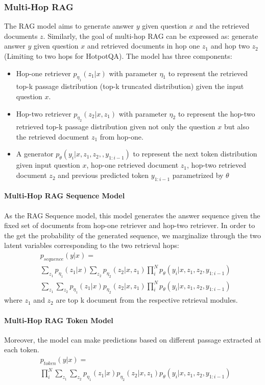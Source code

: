 \subsubsection{Multi-Hop RAG}

The RAG model aims to generate answer $y$ given question $x$ and the retrieved documents $z$. Similarly, the goal of multi-hop RAG can be expressed as: generate answer $y$ given question $x$ and retrieved documents in hop one $z_1$ and hop two $z_2$ (Limiting to two hops for HotpotQA). The model has three components: 
\begin{itemize}
    \item Hop-one retriever $p_{\eta_1}(z_1|x)$ with parameter $\eta_1$ to represent the retrieved top-k passage distribution (top-k truncated distribution) given the input question $x$. 
    \item Hop-two retriever $p_{\eta_2}(z_2|x, z_1)$ with parameter $\eta_2$ to represent the hop-two retrieved top-k passage distribution given not only the question $x$ but also the retrieved document $z_1$ from hop-one. 
    \item A generator $p_\theta(y_i|x, z_1, z_2, , y_{1:i-1})$ to represent the next token distribution given input question $x$, hop-one retrieved document $z_1$, hop-two retrieved document $z_2$ and previous predicted token $y_{1:i-1}$ parametrized by $\theta$
\end{itemize}
 \paragraph{Multi-Hop RAG Sequence Model}
 As the RAG Sequence model, this model generates the answer sequence given the fixed set of documents from hop-one retriever and hop-two retriever. In order to the get the probability of the generated sequence, we marginalize through the two latent variables corresponding to the two retrieval hops:
\begin{align*}
& p_{\textit{sequence}}(y|x) = \\
& \sum_{z_1}  p_{\eta_1}(z_1|x)\sum_{z_2} p_{\eta_2}(z_2|x, z_1) \prod_{i}^{N} p_\theta(y_i|x, z_1, z_2, y_{1:i-1}) \\
& \sum_{z_1} \sum_{z_2}  p_{\eta_1}(z_1|x) p_{\eta_2}(z_2|x, z_1) \prod_{i}^{N} p_\theta(y_i|x, z_1, z_2, y_{1:i-1})
\end{align*}
where $z_1$ and $z_2$ are top k document from the respective retrieval modules.

 \paragraph{Multi-Hop RAG Token Model}
 Moreover, the model can make predictions based on different passage extracted at each token. 
\begin{align*}
& p_{\textit{token}}(y|x) = \\
& \prod_{i}^{N}  \sum_{z_1}  \sum_{z_2} p_{\eta_1}(z_1|x) p_{\eta_2}(z_2|x, z_1) p_\theta(y_i|x, z_1, z_2, y_{1:i-1})
\end{align*}

